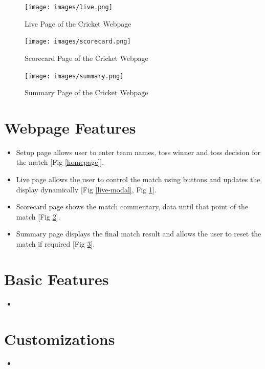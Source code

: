 \documentclass[a4paper,12pt]{article}
\begin{document}
\begin{figure}[h!]
\centering
\texttt{[image: images/live.png]}
\caption{Live Page of the Cricket Webpage}
\label{live}
\end{figure}

\vspace{1.5cm}

\begin{figure}[h!]
\centering
\texttt{[image: images/scorecard.png]}
\caption{Scorecard Page of the Cricket Webpage}
\label{scorecard}
\end{figure}

\begin{figure}[h!]
\centering
\texttt{[image: images/summary.png]}
\caption{Summary Page of the Cricket Webpage}
\label{summary}
\end{figure}  

\section{Webpage Features}
\begin{itemize}
  \item Setup page allows user to enter team names, toss winner and toss decision for the match [Fig \ref{homepage}].
  \item Live page allows the user to control the match using buttons and updates the display dynamically [Fig \ref{live-modal}, Fig \ref{live}].
  \item Scorecard page shows the match commentary, data until that point of the match [Fig \ref{scorecard}].
  \item Summary page displays the final match result and allows the user to reset the match if required [Fig \ref{summary}].
\end{itemize}

\section{Basic Features}
\begin{itemize}
\item 
\end{itemize}

\section{Customizations}
\begin{itemize}
\item 
\end{itemize}
\end{document}
